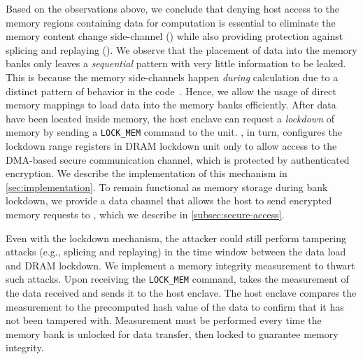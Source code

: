 Based on the observations above, we conclude that denying host access to the memory regions containing data for \thename computation is essential to eliminate the memory content change side-channel () while also providing protection against splicing and replaying ().
We observe that the placement of data into the memory banks only leaves a \emph{sequential} pattern with very little information to be leaked. This is because the memory side-channels happen \emph{during} calculation due to a distinct pattern of behavior in the code~\cite{raccoon,sgx-cache-attack,membuster}. Hence, we allow the usage of direct memory mappings to load data into the memory banks efficiently. After data have been located inside memory, the host enclave can request a \emph{lockdown} of memory by sending a \texttt{LOCK\_MEM} command to the \thename unit. \thename, in turn, configures the lockdown range registers in DRAM lockdown unit only to allow access to the DMA-based secure communication channel, which is protected by authenticated encryption. We describe the implementation of this mechanism in \cref{sec:implementation}. To remain functional as memory storage during bank lockdown, we provide a data channel that allows the host to send encrypted memory requests to \thename, which we describe in \cref{subsec:secure-access}.





 Even with the lockdown mechanism, the attacker could still perform tampering attacks (e.g., splicing and replaying) in the time window between the data load and DRAM lockdown. We implement a memory integrity measurement to thwart such attacks. Upon receiving the \texttt{LOCK\_MEM} command, \thename takes the measurement of the data received and sends it to the host enclave. The host enclave compares the measurement to the precomputed hash value of the data to confirm that it has not been tampered with. Measurement must be performed every time the memory bank is unlocked for data transfer, then locked to guarantee memory integrity. 



